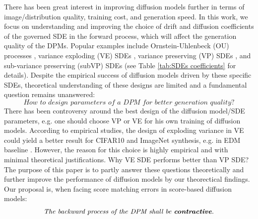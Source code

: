 \documentclass[letterpaper,10pt,reqno]{amsart}
\numberwithin{equation}{section}
\begin{document}
\quad There has been great interest in improving diffusion models further in terms of image/distribution quality, training cost, and generation speed. In this work, we focus on understanding and improving the choice of drift and diffusion coefficients of the governed SDE in the forward process, which will affect the generation quality of the DPMs. Popular examples include
Ornstein-Uhlenbeck (OU) processes \cite{DV21},
variance exploding (VE) SDEs \cite{Song19},
variance preserving (VP) SDEs \cite{Ho20},
and sub-variance preserving (subVP) SDEs \cite{Song20} (see Table \ref{tab:SDEs coefficients} for details). Despite the empirical success of diffusion models driven by these specific SDEs, theoretical understanding of these designs are limited and a fundamental question remains unanswered:
$$\textit{How to design parameters of a DPM for better generation quality?}$$
\quad There has been controversy around the best design of the diffusion model/SDE parameters, e.g. one should choose VP or VE for his own training of diffusion models. According to empirical studies, the design of exploding variance in VE could yield a better result for CIFAR10 and ImageNet synthesis, e.g. in EDM baseline \cite{karras2022elucidating}. However, the reason for this choice is highly empirical and with minimal theoretical justifications. Why VE SDE performs better than VP SDE? The purpose of this paper is to partly answer these questions theoretically and further improve the performance of diffusion models by our theorectical findings. Our proposal is, when facing score matching errors in score-based diffusion models:
$$\textit{The backward process of the DPM shall be \textbf{contractive}.}$$
\end{document}
